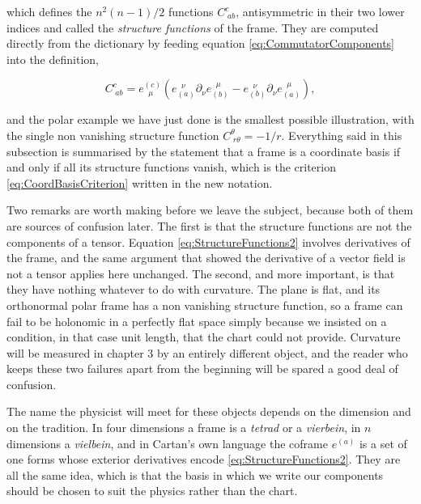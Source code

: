         which defines the $n^2(n-1)/2$ functions $C^{c}_{\;ab}$, antisymmetric in their two lower indices and called the \textit{structure functions} of the frame. They are computed directly from the dictionary by feeding equation \ref{eq:CommutatorComponents} into the definition,

        \begin{equation}\label{eq:StructureFromDict}
            C^{c}_{\;ab} = e^{(c)}_{\;\;\mu}\left(e_{(a)}^{\;\;\nu}\partial_{\nu}e_{(b)}^{\;\;\mu} - e_{(b)}^{\;\;\nu}\partial_{\nu}e_{(a)}^{\;\;\mu}\right),
        \end{equation}

        and the polar example we have just done is the smallest possible illustration, with the single non vanishing structure function $C^{\theta}_{\;r\theta} = -1/r$. Everything said in this subsection is summarised by the statement that a frame is a coordinate basis if and only if all its structure functions vanish, which is the criterion \ref{eq:CoordBasisCriterion} written in the new notation.

        Two remarks are worth making before we leave the subject, because both of them are sources of confusion later. The first is that the structure functions are not the components of a tensor. Equation \ref{eq:StructureFunctions2} involves derivatives of the frame, and the same argument that showed the derivative of a vector field is not a tensor applies here unchanged. The second, and more important, is that they have nothing whatever to do with curvature. The plane is flat, and its orthonormal polar frame has a non vanishing structure function, so a frame can fail to be holonomic in a perfectly flat space simply because we insisted on a condition, in that case unit length, that the chart could not provide. Curvature will be measured in chapter 3 by an entirely different object, and the reader who keeps these two failures apart from the beginning will be spared a good deal of confusion.

        The name the physicist will meet for these objects depends on the dimension and on the tradition. In four dimensions a frame is a \textit{tetrad} or a \textit{vierbein}, in $n$ dimensions a \textit{vielbein}, and in Cartan's own language the coframe $e^{(a)}$ is a set of one forms whose exterior derivatives encode \ref{eq:StructureFunctions2}. They are all the same idea, which is that the basis in which we write our components should be chosen to suit the physics rather than the chart.

